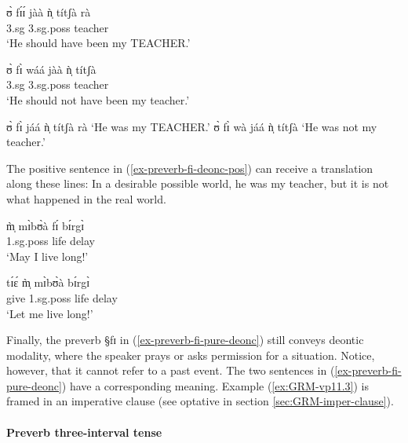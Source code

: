 \begin{exe} 
\ex\label{ex-preverb-fi-deonc}
\begin{xlist}
\ex\label{ex-preverb-fi-deonc-pos}
\gll ʊ̀ fɪ́ɪ́ jàà  ǹ̩ títʃà rà \\
  {\sc 3.sg}  {\mod}  {\ident}    {\sc 3.sg.poss}  teacher {\foc}  \\
\glt  `He should have been my TEACHER.' 

\ex
\gll    ʊ̀ fɪ̀ wáá jàà  ǹ̩ títʃà \\
        {\sc 3.sg} {\mod} {\neg} {\ident}    {\sc 3.sg.poss}  teacher   \\  
\glt   `He should not have been my teacher.'  


\ex
 ʊ̀  fɪ̀ jáá  ǹ̩ títʃà rà `He was my TEACHER.'
\ex
 ʊ̀  fɪ̀ wà jáá  ǹ̩ títʃà `He was not my teacher.'
\end{xlist}
\end{exe} 

The positive sentence in (\ref{ex-preverb-fi-deonc-pos}) can receive  a
translation along these lines:  In a desirable possible world, he was my
teacher, but it is not what happened in
the real world. 

\begin{exe} 
\ex\label{ex-preverb-fi-pure-deonc}
\begin{xlist}
\ex\label{ex:GRM-vp11.2}
\gll m̩̀ mɪ̀bʊ̀à fɪ́  bɪ́rgɪ̀ \\
    {\sc 1.sg.poss} life    {\mod}  delay    \\
\glt  `May I live long!' 

\ex\label{ex:GRM-vp11.3}
\gll tɪ́ɛ́ m̩̀ mɪ̀bʊ̀à bɪ́rgɪ̀ \\
      give {\sc 1.sg.poss} life delay  \\
\glt  `Let me live long!' 
\end{xlist}
\end{exe} 

Finally, the preverb {\S fɪ}  in (\ref{ex-preverb-fi-pure-deonc}) still conveys
 deontic modality, where the speaker prays or asks permission for a 
situation. Notice, however,  that it cannot refer to a past event. The two
sentences
in (\ref{ex-preverb-fi-pure-deonc}) have a corresponding meaning. Example
(\ref{ex:GRM-vp11.3}) is framed in an imperative clause (see optative in section
\ref{sec:GRM-imper-clause}). 


\paragraph{Preverb three-interval tense}
\label{sec:GRM-preverb-three-int-tense}

